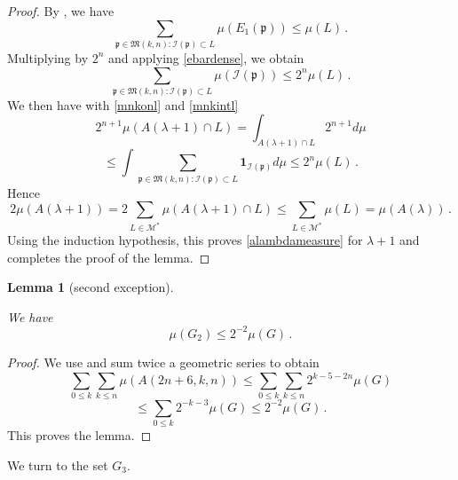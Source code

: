 \documentclass[10pt,a4paper]{article}
\theoremstyle{plain}
\newtheorem{lemma}[theorem]{Lemma}
\theoremstyle{definition}
\numberwithin{equation}{subsection}
\newcommand{\fp}{{\mathfrak p}}
\newcommand{\scI}{{\mathcal{I}}} %
\newcommand{\lean}[1]{}
\newcommand{\uses}[1]{}
\newcommand{\leanok}{}
\begin{document}
\begin{proof}
By , we have
\begin{equation}
\sum_{\fp \in {\mathfrak{M}}(k,n):\scI(\fp) \subset L} \mu({E_1}(\fp)) \leq \mu(L)\, .
\end{equation}
Multiplying by $2^n$ and applying \eqref{ebardense}, we obtain
\begin{equation}\label{mnkintl}
    \sum_{\fp \in {\mathfrak{M}}(k,n):\scI(\fp) \subset L} \mu(\scI(\fp)) \leq 2^n \mu(L)\, .
\end{equation}
We then have with \eqref{mnkonl} and \eqref{mnkintl}
\begin{equation}
2^{n+1}\mu(A(\lambda+1)\cap L) =
 \int_{A(\lambda+1)\cap L} 2^{n+1} d\mu
\end{equation}
\begin{equation}
\le
    \int \sum_{\fp \in {\mathfrak{M}}(k,n):\scI(\fp) \subset L} \mathbf{1}_{\scI(\fp)} d\mu
\le 2^n \mu(L)\, .
\end{equation}
Hence
\begin{equation}
    2\mu(A(\lambda+1))=2\sum_{L\in \mathcal{M}^*}
\mu(A(\lambda+1)\cap L)\le
\sum_{L\in \mathcal{M}^*}\mu( L)= \mu(A(\lambda))\, .
\end{equation}
Using the induction hypothesis, this proves
\eqref{alambdameasure} for $\lambda+1$ and completes the proof of the lemma.
\end{proof}

\begin{lemma}[second exception]
\label{second-exception}
\leanok
\lean{second_exception}
\uses{John-Nirenberg}
We have
\begin{equation}
    \mu(G_2)\le 2^{-2} \mu(G)\, .
\end{equation}
\end{lemma}
\begin{proof}
\leanok
We use  and sum twice a geometric series
to obtain
\begin{equation}
    \sum_{0\le k}\sum_{k\le n}
\mu(A(2n+6,k,n))\le \sum_{0\le k}\sum_{k\le n} 2^{k-5-2n}\mu(G)
\end{equation}
\begin{equation}
   \le \sum_{0\le k} 2^{-k-3}\mu(G)\le 2^{-2}\mu(G)\, .
\end{equation}
This proves the lemma.
\end{proof}


We turn to the set $G_3$.
\end{document}
